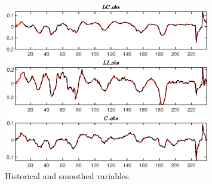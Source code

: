  
\begin{figure}[H]
\centering 
\includegraphics[width=0.80\textwidth]{two_sector_RBC_fixed_cost/graphs/two_sector_RBC_fixed_cost_HistoricalAndSmoothedVariables1}
\caption{Historical and smoothed variables.}\label{Fig:HistoricalAndSmoothedVariables:1}
\end{figure}


